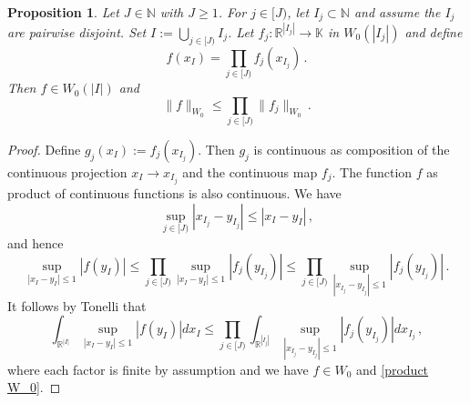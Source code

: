 \documentclass[12pt,reqno]{amsart}
\theoremstyle{plain}
\newtheorem{proposition}[theorem]{Proposition}
\numberwithin{equation}{section}
\theoremstyle{remark}
\newcommand{\R}{{\mathbb R}}
\newcommand{\N}{{\mathbb N}}
\begin{document}
\begin{proposition}\label{tensor Wiener}
    Let $J\in \N$ with $J\ge 1$. For $j\in [J)$, let $I_j\subset \N$ and assume the $I_j$ are pairwise disjoint.
    Set $I:=\bigcup_{j\in [J)}I_j$. Let $f_j:\R^{|I_j|}\to \mathbb{K}$ in $W_0(|I_j|)$ and define
    \begin{equation}\label{auto:Wiener-product-function}
        f(x_I)=\prod_{j\in [J)}f_j(x_{I_j})\, .
    \end{equation}
    Then $f\in W_0(|I|)$ and
    \begin{equation}\label{product W_0}
        \|f\|_{W_0}\le \prod_{j\in [J)}\|f_j\|_{W_0}\, .
    \end{equation}
\end{proposition}
\begin{proof}
    Define $g_j(x_I):=f_j(x_{I_j})$. Then $g_j$ is continuous as composition of the continuous
    projection $x_I\to x_{I_j}$ and the continuous map $f_j$. The function $f$ as product of
    continuous functions is also continuous.
We have
\begin{equation}
     \sup_{j\in [J)} |x_{I_j}-y_{I_j}|\le |x_I-y_I|\, ,
\end{equation}
and hence
\begin{equation}
    \sup_{|x_I-y_I|\le 1}|f(y_I)|\le \prod_{j\in [J)} \sup_{|x_{I}-y_{I}|\le 1}|f_j(y_{I_j})|\le
    \prod_{j\in [J)} \sup_{|x_{I_j}-y_{I_j}|\le 1}|f_j(y_{I_j})|\, .
\end{equation}
It follows by Tonelli that
\begin{equation}
    \int_{\R^{|I|}}\sup_{|x_I-y_I|\le 1}|f(y_I)|dx_I\le
    \prod_{j\in [J)} \int_{\R^{|I_j|}}\sup_{|x_{I_j}-y_{I_j}|\le 1}|f_j(y_{I_j})|dx_{I_j}\, ,
\end{equation}
    where each factor is finite by assumption and we have $f\in W_0$ and \eqref{product W_0}.
\end{proof}
\end{document}
